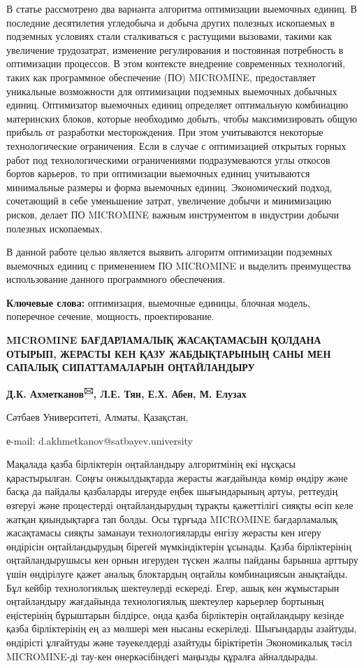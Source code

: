 В статье рассмотрено два варианта алгоритма оптимизации выемочных
единиц. В последние десятилетия угледобыча и добыча других полезных
ископаемых в подземных условиях стали сталкиваться с растущими вызовами,
такими как увеличение трудозатрат, изменение регулирования и постоянная
потребность в оптимизации процессов. В этом контексте внедрение
современных технологий, таких как программное обеспечение (ПО)
MICROMINE, предоставляет уникальные возможности для оптимизации
подземных выемочных добычных единиц. Оптимизатор выемочных единиц
определяет оптимальную комбинацию материнских блоков, которые необходимо
добыть, чтобы максимизировать общую прибыль от разработки месторождения.
При этом учитываются некоторые технологические ограничения. Если в
случае с оптимизацией открытых горных работ под технологическими
ограничениями подразумеваются углы откосов бортов карьеров, то при
оптимизации выемочных единиц учитываются минимальные размеры и форма
выемочных единиц. Экономический подход, сочетающий в себе уменьшение
затрат, увеличение добычи и минимизацию рисков, делает ПО MICROMINE
важным инструментом в индустрии добычи полезных ископаемых.

В данной работе целью является выявить алгоритм оптимизации подземных
выемочных единиц с применением ПО MICROMINE и выделить преимущества
использование данного программного обеспечения.

{\bfseries Ключевые слова:} оптимизация, выемочные единицы, блочная модель,
поперечное сечение, мощность, проектирование.

{\bfseries MICROMINE БАҒДАРЛАМАЛЫҚ ЖАСАҚТАМАСЫН ҚОЛДАНА ОТЫРЫП, ЖЕРАСТЫ КЕН
ҚАЗУ ЖАБДЫҚТАРЫНЫҢ САНЫ МЕН САПАЛЫҚ СИПАТТАМАЛАРЫН ОҢТАЙЛАНДЫРУ}

{\bfseries Д.К. Ахметканов\textsuperscript{🖂}, Л.Е. Тян, Е.Х. Абен, М.
Елузах}

Сәтбаев Университеті, Алматы, Қазақстан,

е-mail: d.akhmetkanov@satbayev.university

Мақалада қазба бірліктерін оңтайландыру алгоритмінің екі нұсқасы
қарастырылған. Соңғы онжылдықтарда жерасты жағдайында көмір өндіру және
басқа да пайдалы қазбаларды игеруде еңбек шығындарының артуы, реттеудің
өзгеруі және процестерді оңтайландырудың тұрақты қажеттілігі сияқты өсіп
келе жатқан қиындықтарға тап болды. Осы тұрғыда MICROMINE бағдарламалық
жасақтамасы сияқты заманауи технологияларды енгізу жерасты кен игеру
өндірісін оңтайландырудың бірегей мүмкіндіктерін ұсынады. Қазба
бірліктерінің оңтайландырушысы кен орнын игеруден түскен жалпы пайданы
барынша арттыру үшін өндірілуге қажет аналық блоктардың оңтайлы
комбинациясын анықтайды. Бұл кейбір технологиялық шектеулерді ескереді.
Егер, ашық кен жұмыстарын оңтайландыру жағдайында технологиялық
шектеулер карьерлер бортының еңістерінің бұрыштарын білдірсе, онда қазба
бірліктерін оңтайландыру кезінде қазба бірліктерінің ең аз мөлшері мен
нысаны ескеріледі. Шығындарды азайтуды, өндірісті ұлғайтуды және
тәуекелдерді азайтуды біріктіретін Экономикалық тәсіл MICROMINE-ді
тау-кен өнеркәсібіндегі маңызды құралға айналдырады.

